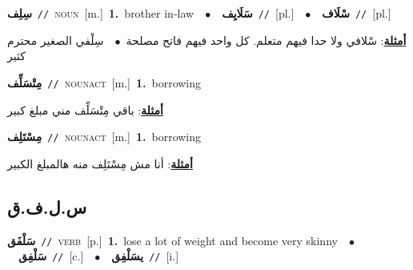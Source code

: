 \documentclass[10pt,a4paper,twoside]{article} %
\begin{document}
\begin{multicols}{2}
{\setlength\topsep{0pt}\textbf{\foreignlanguage{arabic}{سِلِف}}\ {\color{gray}\texttt{//}\color{black}}\ \textsc{noun}\ [m.]\ \textbf{1.}~brother in-law\ \ $\bullet$\ \ \setlength\topsep{0pt}\textbf{\foreignlanguage{arabic}{سَلَايِف}}\ {\color{gray}\texttt{//}\color{black}}\ [pl.]\ \ $\bullet$\ \ \setlength\topsep{0pt}\textbf{\foreignlanguage{arabic}{سْلَاف}}\ {\color{gray}\texttt{//}\color{black}}\ [pl.]\  \begin{flushright}\color{gray}\foreignlanguage{arabic}{\textbf{\underline{\foreignlanguage{arabic}{أمثلة}}}: سْلافي ولا حدا فيهم متعلم. كل واحد فيهم فاتح مصلحة\ $\bullet$\ \  سِلْفي الصغير محترم كثير}\end{flushright}\color{black}} \vspace{2mm}

{\setlength\topsep{0pt}\textbf{\foreignlanguage{arabic}{مِتْسَلِّف}}\ {\color{gray}\texttt{//}\color{black}}\ \textsc{noun\textunderscore act}\ [m.]\ \textbf{1.}~borrowing\  \begin{flushright}\color{gray}\foreignlanguage{arabic}{\textbf{\underline{\foreignlanguage{arabic}{أمثلة}}}: باقي مِتْسَلِّف مني مبلغ كبير}\end{flushright}\color{black}} \vspace{2mm}

{\setlength\topsep{0pt}\textbf{\foreignlanguage{arabic}{مِسْتَلِف}}\ {\color{gray}\texttt{//}\color{black}}\ \textsc{noun\textunderscore act}\ [m.]\ \textbf{1.}~borrowing\  \begin{flushright}\color{gray}\foreignlanguage{arabic}{\textbf{\underline{\foreignlanguage{arabic}{أمثلة}}}: أنا مش مِسْتَلِف منه هالمبلغ الكبير}\end{flushright}\color{black}} \vspace{2mm}

\vspace{-3mm}
\subsection*{\color{blue}\foreignlanguage{arabic}{س.ل.ف.ق}\color{blue}{}} 

{\setlength\topsep{0pt}\textbf{\foreignlanguage{arabic}{سَلْفَق}}\ {\color{gray}\texttt{//}\color{black}}\ \textsc{verb}\ [p.]\ \textbf{1.}~lose a lot of weight and become very skinny\ \ $\bullet$\ \ \setlength\topsep{0pt}\textbf{\foreignlanguage{arabic}{سَلْفِق}}\ {\color{gray}\texttt{//}\color{black}}\ [c.]\ \ $\bullet$\ \ \setlength\topsep{0pt}\textbf{\foreignlanguage{arabic}{يسَلْفِق}}\ {\color{gray}\texttt{//}\color{black}}\ [i.]\ } \vspace{2mm}


\end{multicols}
\end{document}
